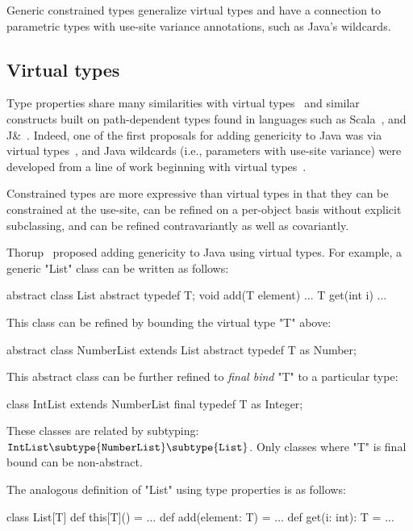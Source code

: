 
Generic constrained types generalize virtual types and 
have a connection to parametric types with use-site variance
annotations, such as Java's wildcards.  

\subsection{Virtual types}

Type properties share many similarities with virtual
types~\cite{mp89-virtual-classes,beta,ernst99-gbeta,ernst06-virtual,cdnw07-tribe}
and similar constructs built on path-dependent types found in
languages such as Scala~\cite{scala}, and J\&~\cite{nqm06}.
Indeed, one of the first proposals for adding genericity to Java
was via virtual types~\cite{thorup97}, and Java
wildcards (i.e., parameters with use-site variance)
were developed from a line of work beginning with virtual
types~\cite{unifying-genericity,variant-parameter-types,adding-wildcards}.

Constrained types are more expressive than virtual
types in that they can be constrained at the use-site,
can be refined on a per-object basis without explicit subclassing,
and can be refined contravariantly
as well as covariantly. 

Thorup~\cite{thorup97}
proposed adding genericity to Java using virtual types.  For example,
a generic \xcd"List" class can be written as follows:
\begin{xten}
abstract class List {
  abstract typedef T;
  void add(T element) { ... }
  T get(int i) { ... }
}
\end{xten}
This class can be refined by bounding the virtual type \xcd"T" above:
\begin{xten}
abstract class NumberList extends List {
  abstract typedef T as Number;
}
\end{xten}
This abstract class can be further refined to \emph{final bind}
\xcd"T" to a particular type:
\begin{xten}
class IntList extends NumberList {
  final typedef T as Integer;
}
\end{xten}
These classes are related by subtyping:
${\tt IntList} \subtype {\tt NumberList} \subtype {\tt List}$.
Only classes where \xcd"T" is final bound can be non-abstract.

The analogous definition of 
\xcd"List" using type properties is as follows:
\begin{xten}
class List[T] {
  def this[T]() = { ... }
  def add(element: T) = { ... }
  def get(i: int): T = { ... }
}
\end{xten}

